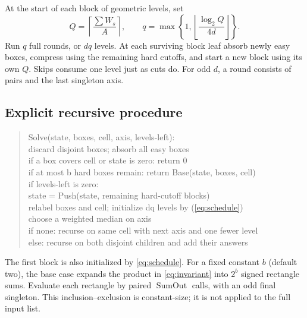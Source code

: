 \documentclass[12pt,a4paper]{article}
\newcommand{\1}{\mathbf1}
\newcommand{\SumOut}{\operatorname{SumOut}}
\begin{document}
At the start of each block of geometric levels, set
\begin{equation}
 Q=\left\lceil\frac{\sum W_s}{A}\right\rceil,\qquad
 q=\max\left\{1,\left\lfloor\frac{\log_2 Q}{4d}\right\rfloor\right\}.
                                                        \label{eq:schedule}
\end{equation}
Run $q$ full rounds, or $dq$ levels. At each surviving block leaf absorb
newly easy boxes, compress using the remaining hard cutoffs, and start
a new block using its own $Q$. Skips consume one level just as cuts do.
For odd $d$, a round consists of pairs and the last singleton axis.

\subsection{Explicit recursive procedure}
\begin{quote}\ttfamily\small
Solve(state, boxes, cell, axis, levels-left):\\
\hspace*{1em}discard disjoint boxes; absorb all easy boxes\\
\hspace*{1em}if a box covers cell or state is zero: return 0\\
\hspace*{1em}if at most b hard boxes remain: return Base(state, boxes, cell)\\
\hspace*{1em}if levels-left is zero:\\
\hspace*{2em}state = Push(state, remaining hard-cutoff blocks)\\
\hspace*{2em}relabel boxes and cell; initialize dq levels by (\ref{eq:schedule})\\
\hspace*{1em}choose a weighted median on axis\\
\hspace*{1em}if none: recurse on same cell with next axis and one fewer level\\
\hspace*{1em}else: recurse on both disjoint children and add their answers
\end{quote}
The first block is also initialized by \eqref{eq:schedule}. For a fixed
constant $b$ (default two), the base case expands the product in
\eqref{eq:invariant} into $2^b$ signed rectangle sums. Evaluate each
rectangle by paired $\SumOut$ calls, with an odd final singleton.
This inclusion--exclusion is constant-size; it is not applied to the full
input list.
\end{document}
